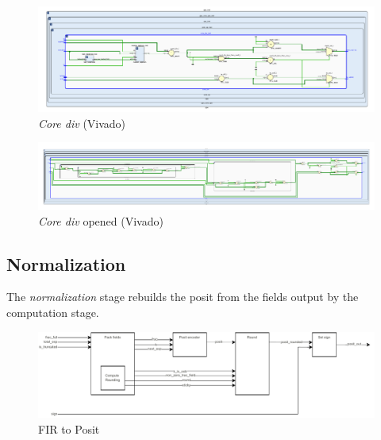     \begin{figure}
        \includegraphics[width=1\textwidth]{figures/div_vivado.pdf}
        \caption{\textit{Core div} (Vivado)}
        \label{fig:div1vivado}
    \end{figure}
    \begin{figure}
        \includegraphics[width=1\textwidth]{figures/div_opened_vivado.pdf}
        \caption{\textit{Core div} opened (Vivado)}
        \label{fig:div2vivado}
    \end{figure}








\subsection{Normalization}

The \textit{normalization} stage rebuilds the posit from the fields output by the computation stage.



\begin{figure}[h!]
    \begin{center}
    \includegraphics[width=1\textwidth]{figures/fir-to-posit-drawing.drawio.pdf}
    \caption{FIR to Posit}
    \label{fig:fir2posit_ppu}
    \end{center}
\end{figure}

